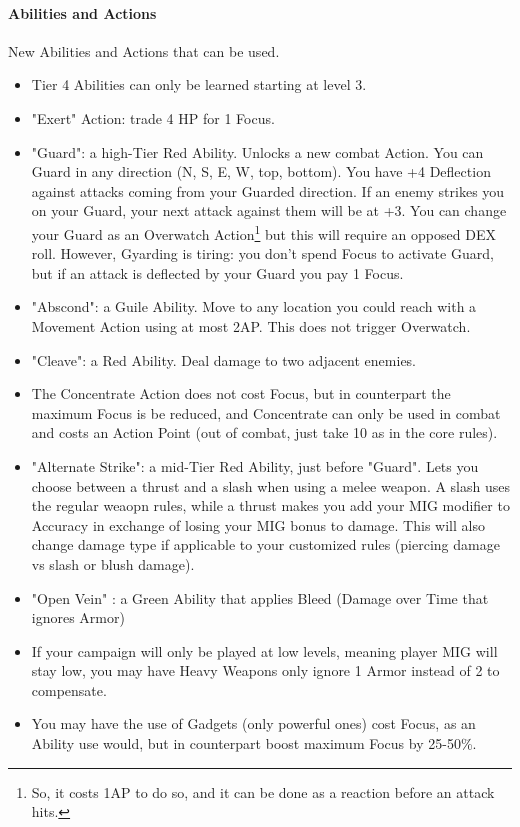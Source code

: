 \paragraph{Abilities and Actions}

New Abilities and Actions that can be used.

\begin{itemize}
    \item Tier 4 Abilities can only be learned starting at level 3.
    \item "Exert" Action: trade 4 HP for 1 Focus.
    \item "Guard": a high-Tier Red Ability. Unlocks a new combat Action. You can Guard in any direction (N, S, E, W, top, bottom). You have +4 Deflection against attacks coming from your Guarded direction. If an enemy strikes you on your Guard, your next attack against them will be at +3. You can change your Guard as an Overwatch Action\footnote{So, it costs 1AP to do so, and it can be done as a reaction before an attack hits.} but this will require an opposed DEX roll. However, Gyarding is tiring: you don't spend Focus to activate Guard, but if an attack is deflected by your Guard you pay 1 Focus.
    \item "Abscond": a Guile Ability. Move to any location you could reach with a Movement Action using at most 2AP. This does not trigger Overwatch.
    \item "Cleave": a Red Ability. Deal damage to two adjacent enemies.
    \item The Concentrate Action does not cost Focus, but in counterpart the maximum Focus is be reduced, and Concentrate can only be used in combat and costs an Action Point (out of combat, just take 10 as in the core rules).
    \item "Alternate Strike": a mid-Tier Red Ability, just before "Guard". Lets you choose between a thrust and a slash when using a melee weapon. A slash uses the regular weaopn rules, while a thrust makes you add your MIG modifier to Accuracy in exchange of losing your MIG bonus to damage. This will also change damage type if applicable to your customized rules (piercing damage vs slash or blush damage).
    \item "Open Vein" : a Green Ability that applies Bleed (Damage over Time that ignores Armor)
    \item If your campaign will only be played at low levels, meaning player MIG will stay low, you may have Heavy Weapons only ignore 1 Armor instead of 2 to compensate.
    \item You may have the use of Gadgets (only powerful ones) cost Focus, as an Ability use would, but in counterpart boost maximum Focus by 25-50\%.
\end{itemize}

